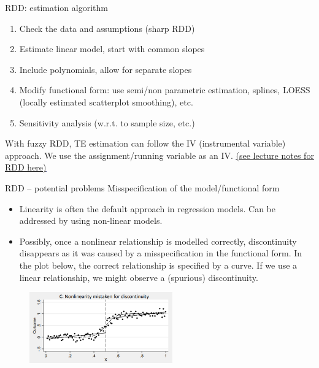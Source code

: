 \documentclass{beamer}
\begin{document}
\begin{frame}{RDD: estimation algorithm}
\begin{enumerate}
    \item Check the data and assumptions (sharp RDD)
    \medskip
    \item Estimate linear model, start with common slopes
    \medskip
    \item Include polynomials, allow for separate slopes
    \medskip
    \item Modify functional form: use semi/non parametric estimation, splines, LOESS (locally estimated scatterplot smoothing), etc.
    \medskip
    \item Sensitivity analysis (w.r.t. to sample size, etc.)
\end{enumerate}
\bigskip
With fuzzy RDD, TE estimation can follow the IV (instrumental variable) approach. We use the assignment/running variable as an IV. \textcolor{blue}{\underline{\href{https://clas.ucdenver.edu/marcelo-perraillon/teaching/health-services-research-methods-i-hsmp-7607}{(see lecture notes for RDD here)}}}
\end{frame}
\begin{frame}{RDD -- potential problems}
Misspecification of the model/functional form
\begin{itemize}
    \item Linearity is often the default approach in regression models. Can be addressed by using non-linear models.
    \item Possibly, once a nonlinear relationship is modelled correctly, discontinuity disappears as it was caused by a misspecification in the functional form. In the plot below, the correct relationship is specified by a curve. If we use a linear relationship, we might observe a (spurious) discontinuity.
\end{itemize}
\begin{figure}
    \centering
    \includegraphics[width=0.55\textwidth]{./IMG/RDD3.png}
\end{figure}    
\end{frame}
\end{document}
